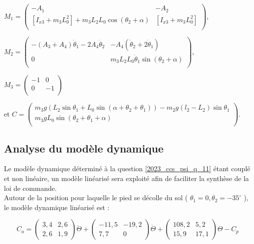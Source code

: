 \begin{corrige}
$M_1 = \begin{pmatrix}
-A_1 & - A_2 \\
\left[I_{x 3}+m_{3} L_{0}^{2}\right]  +m_{3} L_{2} L_{0}\cos \left(\theta_{2}+\alpha\right) & \left[I_{x 3}+m_{3} L_{0}^{2}\right] \\
\end{pmatrix}$,

$M_2 = \begin{pmatrix}
-\left(A_{3}+A_4\right) \dot{\theta}_{1}-2A_4 \dot{\theta}_2  & -A_4\left(\dot{\theta}_2+2\dot{\theta}_1\right) \\
0 & m_{3} L_{2} L_{0} \dot{\theta}_{1} \sin \left(\theta_{2}+\alpha\right) \\
\end{pmatrix}$, 

$M_3 = \begin{pmatrix}
- 1 & 0 \\
0 & - 1  \\
\end{pmatrix}$

et 
$C = \begin{pmatrix}
 m_3 g\left(  L_2 \sin \theta_1 +  L_0 \sin\left( \alpha + \theta_2 + \theta_1\right)\right) - m_2 g\left( l_2 - L_2\right) \sin \theta_1 \\
m_{3} g L_{0} \sin \left(\theta_{2}+\theta_{1}+\alpha\right) \\
\end{pmatrix}$.


\end{corrige}
\else
\fi


\subsection{Analyse du modèle dynamique}
Le modèle dynamique déterminé à la question \ref{2023_ccs_psi_q_11} étant couplé et non linéaire, un modèle linéarisé sera exploité afin de faciliter la synthèse de la loi de commande.\\
Autour de la position pour laquelle le pied se décolle du sol ( $\theta_{1}=0, \theta_{2}=-35^{\circ}$ ), le modèle dynamique linéarisé est :

$$
C_{a}=\left(\begin{array}{cc}
3,4 & 2,6 \\
2,6 & 1,9
\end{array}\right) \ddot{\Theta}+\left(\begin{array}{cc}
-11,5 & -19,2 \\
7,7 & 0
\end{array}\right) \dot{\Theta}+\left(\begin{array}{cc}
108,2 & 5,2 \\
15,9 & 17,1
\end{array}\right) \Theta-C_{p}
$$

